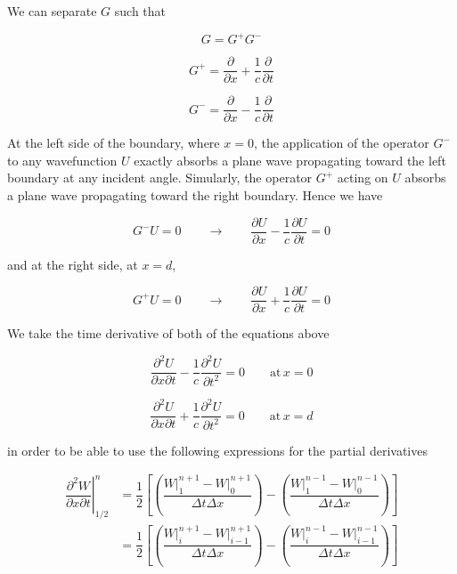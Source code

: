 \documentclass{article}
\begin{document}
We can separate \(G\) such that

\begin{equation}
G = G^+ G^-
\end{equation}

\begin{equation}
G^+ = \dfrac{\partial}{\partial x} + \dfrac{1}{c} \dfrac{\partial}{\partial t}
\end{equation}

\begin{equation}
G^- = \dfrac{\partial}{\partial x} - \dfrac{1}{c} \dfrac{\partial}{\partial t}
\end{equation}

At the left side of the boundary, where \(x=0\), the application of the
operator \(G^-\) to any wavefunction \(U\) exactly absorbs a plane wave
propagating toward the left boundary at any incident angle. Simularly,
the operator \(G^+\) acting on \(U\) absorbs a plane wave propagating
toward the right boundary. Hence we have

\begin{equation}
G^-U = 0 \qquad \longrightarrow \qquad \dfrac{\partial U}{\partial x} - \dfrac{1}{c} \dfrac{\partial U}{\partial t} = 0
\end{equation}

and at the right side, at \(x=d\),

\begin{equation}
G^+U = 0 \qquad \longrightarrow \qquad \dfrac{\partial U}{\partial x} + \dfrac{1}{c} \dfrac{\partial U}{\partial t} = 0
\end{equation}

We take the time derivative of both of the equations above

\begin{equation}
\dfrac{\partial^2 U}{\partial x \partial t} - \dfrac{1}{c} \dfrac{\partial^2 U}{\partial t^2} = 0 \qquad \mathrm{at} \, x = 0
\end{equation}

\begin{equation}
\dfrac{\partial^2 U}{\partial x \partial t} + \dfrac{1}{c} \dfrac{\partial^2 U}{\partial t^2} = 0 \qquad \mathrm{at} \, x = d
\end{equation}

in order to be able to use the following expressions for the partial
derivatives

\begin{align}
\left . \dfrac{\partial^2 W}{\partial x \partial t} \right |^n_{1/2} &= \dfrac{1}{2} \left [ \left( \dfrac{W \big|_{1}^{n+1} - W \big|_{0}^{n+1} }{\Delta t \Delta x} \right ) - \left( \dfrac{W \big|_{1}^{n-1} - W \big|_{0}^{n-1} }{\Delta t \Delta x} \right ) \right ] 
\\
&= \dfrac{1}{2} \left [ \left( \dfrac{W \big|_{i}^{n+1} - W \big|_{i-1}^{n+1} }{\Delta t \Delta x} \right ) - \left( \dfrac{W \big|_{i}^{n-1} - W \big|_{i-1}^{n-1} }{\Delta t \Delta x} \right ) \right ]
\end{align}
\end{document}

